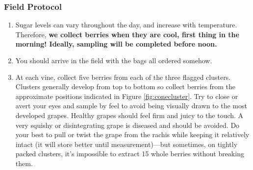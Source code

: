 \documentclass[11pt,letter]{article}
\begin{document}
\subsubsection{Field Protocol}
\begin{enumerate}
\item Sugar levels can vary throughout the day, and increase with temperature. Therefore, {\bf we collect berries when they are cool, first thing in the morning! Ideally, sampling will be completed before noon.}

\item You should arrive in the field with the bags all ordered somehow. %


\item At each vine, collect five berries from each of the three flagged clusters. Clusters generally develop from top to bottom so collect berries from the approximate positions indicated in Figure \ref{fig:conecluster}. Try to close or avert your eyes and sample by feel to avoid being visually drawn to the most developed grapes. Healthy grapes should feel firm and juicy to the touch. A very squishy or disintegrating grape is diseased and should be avoided. Do your best to pull or twist the grape from the rachis while keeping it relatively intact (it will store better until measurement)---but sometimes, on tightly packed clusters, it’s impossible to extract 15 whole berries without breaking them. 


\end{enumerate}
\end{document}
